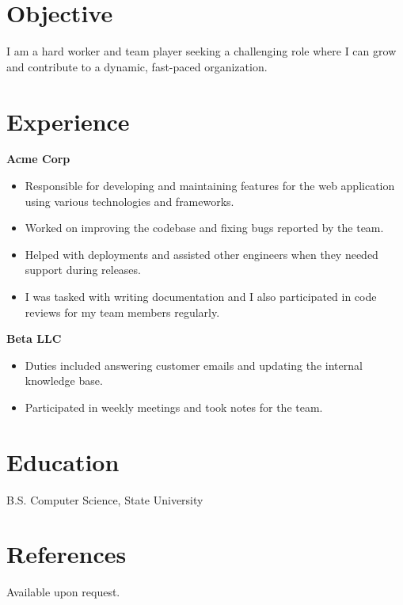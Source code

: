 \documentclass{article}
\begin{document}

\section{Objective}
I am a hard worker and team player seeking a challenging role where I can grow
and contribute to a dynamic, fast-paced organization.

\section{Experience}
\textbf{Acme Corp}
\begin{itemize}
  \item Responsible for developing and maintaining features for the web application using various technologies and frameworks.
  \item Worked on improving the codebase and fixing bugs reported by the team.
  \item Helped with deployments and assisted other engineers when they needed support during releases.
  \item I was tasked with writing documentation and I also participated in code reviews for my team members regularly.
\end{itemize}

\textbf{Beta LLC}
\begin{itemize}
  \item Duties included answering customer emails and updating the internal knowledge base.
  \item Participated in weekly meetings and took notes for the team.
\end{itemize}

\section{Education}
B.S. Computer Science, State University

\section{References}
Available upon request.
\end{document}
